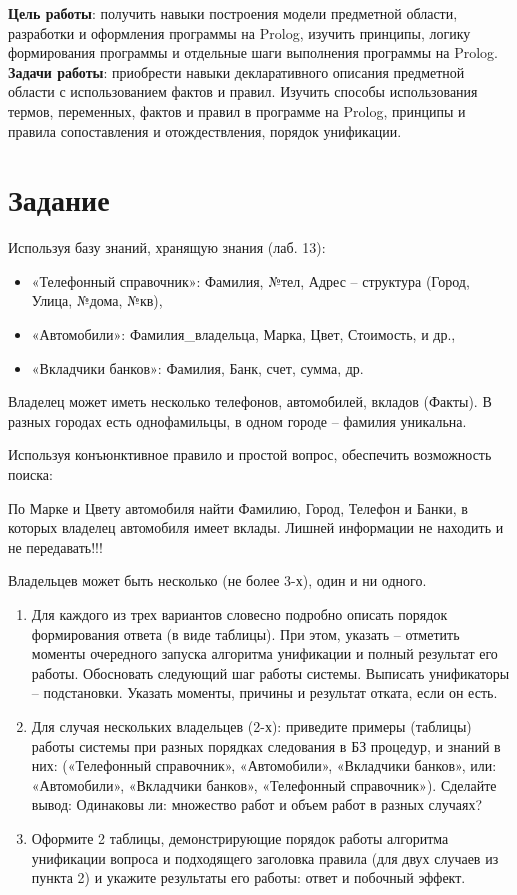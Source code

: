 \documentclass[a4paper,12pt]{article}
\begin{document}
	
	
	
	\textbf{Цель работы}: получить навыки построения модели предметной области, разработки и оформления программы на Prolog, изучить принципы, логику формирования программы и отдельные шаги выполнения программы на Prolog.\\
	
	\textbf{Задачи работы}: приобрести навыки декларативного описания предметной области с использованием фактов и правил.
	Изучить способы использования термов, переменных, фактов и правил в программе на Prolog, принципы  и правила сопоставления и отождествления, порядок унификации.
	
\section*{Задание}
	
Используя  базу знаний, хранящую знания (лаб. 13):
\begin{itemize}
	\item «Телефонный справочник»: Фамилия, №тел, Адрес – структура (Город, Улица, №дома, №кв),
	\item «Автомобили»: Фамилия\_владельца, Марка, Цвет, Стоимость, и др.,
	\item «Вкладчики банков»: Фамилия, Банк, счет, сумма, др.
\end{itemize}
	
Владелец может иметь несколько телефонов, автомобилей, вкладов (Факты). В разных городах есть однофамильцы, в одном городе – фамилия уникальна.

Используя конъюнктивное правило и простой вопрос, обеспечить возможность поиска:

По Марке и Цвету автомобиля найти Фамилию, Город, Телефон и Банки, в которых владелец автомобиля имеет вклады. Лишней информации не находить и не передавать!!!

Владельцев может быть несколько (не более 3-х), один и ни одного.

\begin{enumerate}
\item Для каждого из трех вариантов словесно подробно описать порядок формирования ответа (в виде таблицы). При этом, указать – отметить моменты очередного запуска алгоритма унификации и полный результат его работы. Обосновать следующий шаг работы системы. Выписать унификаторы – подстановки. Указать моменты, причины и результат отката, если он есть.
\item Для случая нескольких владельцев (2-х): 
приведите примеры (таблицы) работы системы при разных порядках следования в БЗ  процедур, и знаний в них: («Телефонный справочник», «Автомобили», «Вкладчики банков», или: «Автомобили», «Вкладчики банков», «Телефонный справочник»). Сделайте вывод: Одинаковы ли: множество работ и объем работ в разных случаях?
\item Оформите 2 таблицы, демонстрирующие порядок работы алгоритма унификации вопроса и подходящего заголовка правила (для двух случаев из пункта 2) и укажите результаты его работы: ответ и побочный эффект.
\end{enumerate}
		
\end{document}
